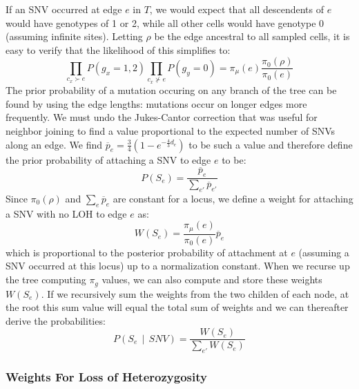 \documentclass[../../main.tex]{subfiles}
\begin{document}
If an SNV occurred at edge $e$ in $T$, we would expect that all descendents of $e$ would have genotypes of 1 or 2, while all other cells would have genotype 0 (assuming infinite sites).
Letting $\rho$ be the edge ancestral to all sampled cells, it is easy to verify that the likelihood of this simplifies to:
\begin{equation*}
    \prod_{c_x\succ e}P(g_x =1,2)\prod_{c_x\nsucc e} P(g_y = 0) = \pi_\mu(e)\frac{\pi_0(\rho)}{\pi_0(e)}
\end{equation*}
The prior probability of a mutation occuring on any branch of the tree can be found by using the edge lengths: mutations occur on longer edges more frequently.
We must undo the Jukes-Cantor correction that was useful for neighbor joining to find a value proportional to the expected number of SNVs along an edge.
We find $\overline{p}_e = \frac{3}{4}\left(1-e^{-\frac{4}{3}d_e}\right)$ to be such a value and therefore define the prior probability of attaching a SNV to edge $e$ to be:
\begin{equation*}
    P(S_e) = \frac{\overline{p}_e}{\sum_{e'}\overline{p}_{e'}}
\end{equation*}
Since $\pi_0(\rho)$ and $\sum_{e}\overline{p}_{e}$ are constant for a locus, we define a weight for attaching a SNV with no LOH to edge $e$ as:
\begin{equation*}
    W(S_e) = \frac{\pi_\mu(e)}{\pi_0(e)} \overline{p}_e
\end{equation*}
which is proportional to the posterior probability of attachment at $e$ (assuming a SNV occurred at this locus) up to a normalization constant.
When we recurse up the tree computing $\pi_g$ values, we can also compute and store these weights $W(S_e)$.
If we recursively sum the weights from the two childen of each node, at the root this sum value will equal the total sum of weights and we can thereafter derive the probabilities:
\begin{equation} \label{eq:SNVattachP}
    P(S_e\,\mid\,SNV) = \frac{W(S_e)}{\sum_{e'}W(S_e)}
\end{equation}


\subsubsection*{Weights For Loss of Heterozygosity}
\end{document}
